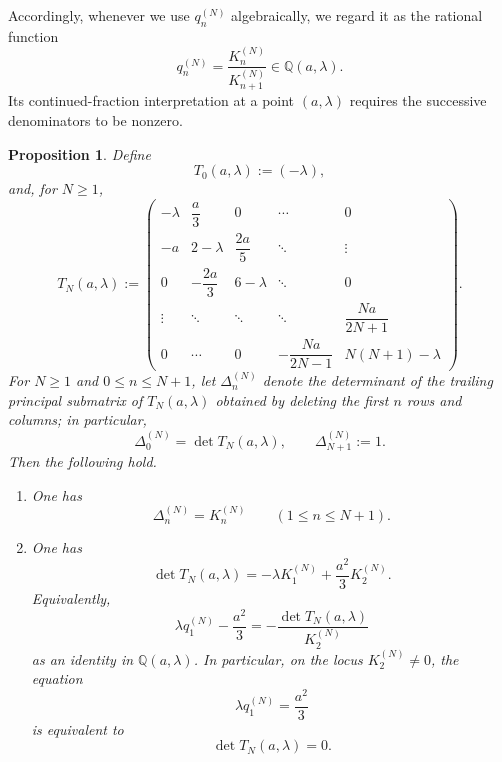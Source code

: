 \documentclass[11pt,letterpaper]{amsart}
\numberwithin{equation}{section}
\theoremstyle{plain}
\newtheorem{proposition}[theorem]{Proposition}
\theoremstyle{remark}
\newcommand{\Q}{\mathbb{Q}}
\begin{document}
Accordingly, whenever we use \(q_n^{(N)}\) algebraically, we regard it as the rational
function
\[
q_n^{(N)}=\frac{K_n^{(N)}}{K_{n+1}^{(N)}}\in \Q(a,\lambda).
\]
Its continued-fraction interpretation at a point \((a,\lambda)\) requires the successive
denominators to be nonzero.


\begin{proposition}\label{prop:truncants-determinants}
Define
\[
T_0(a,\lambda):=(-\lambda),
\]
and, for \(N\ge 1\),
\begin{equation}\label{eq:TN-def}
T_N(a,\lambda):=
\begin{pmatrix}
-\lambda & \dfrac{a}{3} & 0 & \cdots & 0 \\
-a & 2-\lambda & \dfrac{2a}{5} & \ddots & \vdots \\
0 & -\dfrac{2a}{3} & 6-\lambda & \ddots & 0 \\
\vdots & \ddots & \ddots & \ddots & \dfrac{Na}{2N+1} \\
0 & \cdots & 0 & -\dfrac{Na}{2N-1} & N(N+1)-\lambda
\end{pmatrix}.
\end{equation}
For \(N\ge 1\) and \(0\le n\le N+1\), let \(\Delta_n^{(N)}\) denote the determinant of the
trailing principal submatrix of \(T_N(a,\lambda)\) obtained by deleting the first \(n\) rows
and columns; in particular,
\[
\Delta_0^{(N)}=\det T_N(a,\lambda),
\qquad
\Delta_{N+1}^{(N)}:=1.
\]
Then the following hold.
\begin{enumerate}[label=\textup{(\roman*)}]
\item
One has
\[
\Delta_n^{(N)}=K_n^{(N)}
\qquad(1\le n\le N+1).
\]
\item
One has
\begin{equation}\label{eq:detT-K}
\det T_N(a,\lambda)=-\lambda K_1^{(N)}+\frac{a^2}{3}K_2^{(N)}.
\end{equation}
Equivalently,
\begin{equation}\label{eq:truncation-rational-identity}
\lambda q_1^{(N)}-\frac{a^2}{3}
=
-\frac{\det T_N(a,\lambda)}{K_2^{(N)}}
\end{equation}
as an identity in \(\Q(a,\lambda)\). In particular, on the locus \(K_2^{(N)}\neq 0\), the
equation
\begin{equation}\label{eq:truncation-eqn}
\lambda q_1^{(N)}=\frac{a^2}{3}
\end{equation}
is equivalent to
\begin{equation}\label{eq:truncation-det}
\det T_N(a,\lambda)=0.
\end{equation}
\end{enumerate}
\end{proposition}
\end{document}
